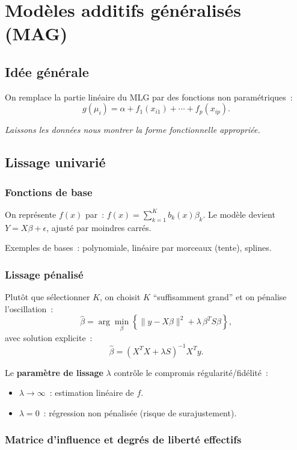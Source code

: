 \documentclass[11pt,letterpaper]{article}
\begin{document}
\section{Modèles additifs généralisés (MAG)}

\subsection{Idée générale}

On remplace la partie linéaire du MLG par des fonctions non paramétriques~:
$$g(\mu_i) = \alpha + f_1(x_{i1}) + \cdots + f_p(x_{ip}).$$

\begin{center}
\textit{Laissons les données nous montrer la forme fonctionnelle appropriée.}
\end{center}

\subsection{Lissage univarié}

\subsubsection{Fonctions de base}
On représente $f(x)$ par~: $f(x) = \sum_{k=1}^K b_k(x)\beta_k$. Le modèle devient $Y = X\beta + \epsilon$, ajusté par moindres carrés.

Exemples de bases~: polynomiale, linéaire par morceaux (tente), splines.

\subsubsection{Lissage pénalisé}

Plutôt que sélectionner $K$, on choisit $K$ ``suffisamment grand'' et on pénalise l'oscillation~:
$$\hat{\beta} = \arg\min_\beta \left\{\|y - X\beta\|^2 + \lambda\,\beta^T S\beta\right\},$$
avec solution explicite~:
$$\hat{\beta} = (X^TX + \lambda S)^{-1}X^Ty.$$

Le \textbf{paramètre de lissage} $\lambda$ contrôle le compromis régularité/fidélité~:
\begin{itemize}
\item $\lambda \to \infty$~: estimation linéaire de $f$.
\item $\lambda = 0$~: régression non pénalisée (risque de surajustement).
\end{itemize}

\subsubsection{Matrice d'influence et degrés de liberté effectifs}
\end{document}

